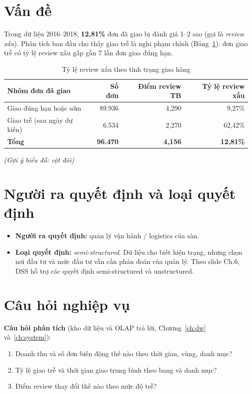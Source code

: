 \documentclass[12pt,a4paper]{report}
\newcommand{\bieudo}[1]{\par{\small\textit{(Gợi ý biểu đồ: #1)}}\par}
\renewcommand{\_}{\oldunderscore\allowbreak}
\begin{document}
\section{Vấn đề}

Trong dữ liệu 2016--2018, \textbf{12,81\%} đơn đã giao bị đánh giá 1--2 sao (gọi là \emph{review xấu}). Phân tích ban đầu cho thấy giao trễ là nghi phạm chính (Bảng~\ref{tab:late-vs-ontime}): đơn giao trễ có tỷ lệ review xấu gấp gần 7 lần đơn giao đúng hạn.

\begin{table}[H]
\centering
\caption{Tỷ lệ review xấu theo tình trạng giao hàng}\label{tab:late-vs-ontime}
\begin{tabular}{lrrr}
\toprule
Nhóm đơn đã giao & Số đơn & Điểm review TB & Tỷ lệ review xấu \\
\midrule
Giao đúng hạn hoặc sớm & 89.936 & 4,290 & 9,27\% \\
Giao trễ (sau ngày dự kiến) & 6.534 & 2,270 & 62,42\% \\
\midrule
\textbf{Tổng} & \textbf{96.470} & \textbf{4,156} & \textbf{12,81\%} \\
\bottomrule
\end{tabular}
\end{table}
\bieudo{cột đôi}

\section{Người ra quyết định và loại quyết định}

\begin{itemize}
\item \textbf{Người ra quyết định:} quản lý vận hành / logistics của sàn.
\item \textbf{Loại quyết định:} \emph{semi-structured}. Dữ liệu cho biết hiện trạng, nhưng chọn nơi đầu tư và mức đầu tư vẫn cần phán đoán của quản lý. Theo slide Ch.6, DSS hỗ trợ các quyết định semi-structured và unstructured.
\end{itemize}

\section{Câu hỏi nghiệp vụ}

\textbf{Câu hỏi phân tích} (kho dữ liệu và OLAP trả lời, Chương~\ref{ch:dw} và~\ref{ch:system}):
\begin{enumerate}
\item Doanh thu và số đơn biến động thế nào theo thời gian, vùng, danh mục?
\item Tỷ lệ giao trễ và thời gian giao trung bình theo bang và danh mục?
\item Điểm review thay đổi thế nào theo mức độ trễ?
\end{enumerate}
\end{document}
